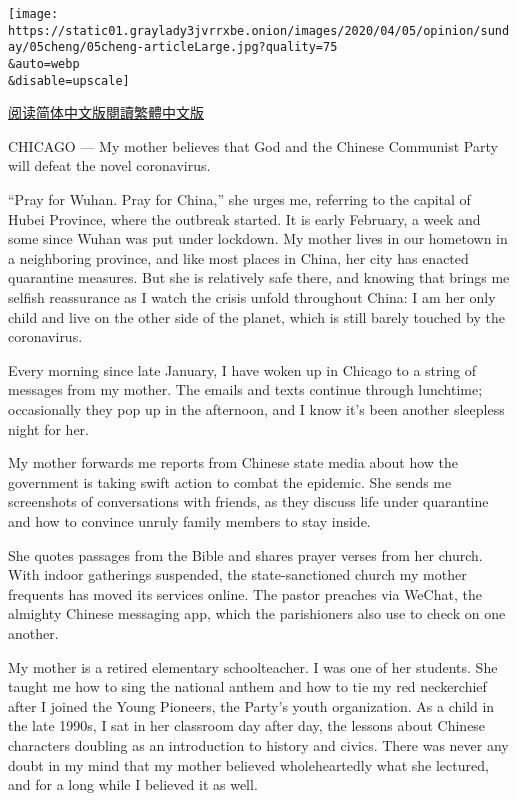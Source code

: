 \texttt{[image: https://static01.graylady3jvrrxbe.onion/images/2020/04/05/opinion/sunday/05cheng/05cheng-articleLarge.jpg?quality=75\\\&auto=webp\\\&disable=upscale]}

\href{https://cn.nytimes3xbfgragh.onion/opinion/20200410/coronavirus-china-us/}{阅读简体中文版}\href{https://cn.nytimes3xbfgragh.onion/opinion/20200410/coronavirus-china-us/zh-hant/}{閱讀繁體中文版}

CHICAGO --- My mother believes that God and the Chinese Communist Party
will defeat the novel coronavirus.

``Pray for Wuhan. Pray for China,'' she urges me, referring to the
capital of Hubei Province, where the outbreak started. It is early
February, a week and some since Wuhan was put under lockdown. My mother
lives in our hometown in a neighboring province, and like most places in
China, her city has enacted quarantine measures. But she is relatively
safe there, and knowing that brings me selfish reassurance as I watch
the crisis unfold throughout China: I am her only child and live on the
other side of the planet, which is still barely touched by the
coronavirus.

Every morning since late January, I have woken up in Chicago to a string
of messages from my mother. The emails and texts continue through
lunchtime; occasionally they pop up in the afternoon, and I know it's
been another sleepless night for her.

My mother forwards me reports from Chinese state media about how the
government is taking swift action to combat the epidemic. She sends me
screenshots of conversations with friends, as they discuss life under
quarantine and how to convince unruly family members to stay inside.

She quotes passages from the Bible and shares prayer verses from her
church. With indoor gatherings suspended, the state-sanctioned church my
mother frequents has moved its services online. The pastor preaches via
WeChat, the almighty Chinese messaging app, which the parishioners also
use to check on one another.

My mother is a retired elementary schoolteacher. I was one of her
students. She taught me how to sing the national anthem and how to tie
my red neckerchief after I joined the Young Pioneers, the Party's youth
organization. As a child in the late 1990s, I sat in her classroom day
after day, the lessons about Chinese characters doubling as an
introduction to history and civics. There was never any doubt in my mind
that my mother believed wholeheartedly what she lectured, and for a long
while I believed it as well.

